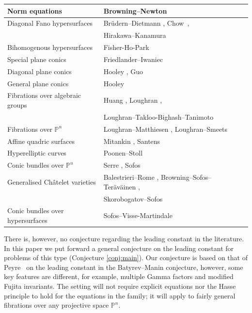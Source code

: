 \documentclass[a4paper,12pt,reqno]{amsart}
\numberwithin{equation}{section} \numberwithin{figure}{section}
\renewcommand\P{\mathbb{P}}
\renewcommand{\#}{\sharp}
\theoremstyle{definition}
\numberwithin{lemma}{section}
\begin{document}
\begin{center}
\begin{longtable}{| l | l | l | l |}
Norm equations & Browning--Newton \cite{BN15}        \\ \hline 



Diagonal Fano hypersurfaces & Br\"{u}dern--Dietmann \cite{MR3177289}, Chow~\cite{MR3253291},      
\\ & Hirakawa--Kanamura \cite{MR4322838}  \\ \hline 

Bihomogenous hypersurfaces  &
Fisher-Ho-Park \cite{FHP21} \\ \hline
Special plane conics  & Friedlander--Iwaniec   \cite{MR2675875}     \\ \hline 
 Diagonal plane conics & Hooley \cite{Hoo93}, Guo \cite{Guo95}     \\ \hline
   General plane conics & Hooley \cite{Hoo07}    \\ \hline 
  Fibrations over algebraic groups & Huang \cite{Hua21}, Loughran \cite{Lou18}, \\
  &  Loughran--Takloo-Bighash--Tanimoto  \cite{LTBT20} \\ \hline
  Fibrations over $\P^n$ &  Loughran--Matthiesen \cite {LM19}, Loughran--Smeets \cite{LS16}    \\ \hline 
Affine quadric surfaces &  Mitankin \cite{MR3664529}, Santens \cite{MR4450612}    \\ \hline 
Hyperelliptic curves &  Poonen--Stoll \cite{MR3245014}    \\ \hline 
Conic bundles over $\P^n$ &  Serre \cite{Ser90}, Sofos \cite{Sof16}    \\ \hline 
   Generalised {C}h\^{a}telet varieties &  Balestrieri--Rome \cite{BRbs}, Browning--Sofos--Ter\"av\"ainen \cite{bst},
\\ &
Skorobogatov--Sofos \cite {MR4542704}    \\ \hline 
 Conic bundles over hypersurfaces &  Sofos--Visse-Martindale \cite{MR4353917}    \\ \hline 
\end{longtable}
\end{center} 
\vspace{-20pt}

There is, however, no conjecture regarding the leading constant in the literature. 
In this paper we put forward a general conjecture  on the leading constant for problems of this type (Conjecture \ref{conj:main}). Our conjecture is based on that of Peyre~\cite{Pey95} on the leading constant in the Batyrev--Manin conjecture,
however, some key features are different, for example, multiple Gamma factors and modified Fujita invariants.  
The setting
will not require explicit equations nor the Hasse principle to hold for the equations in the family; 
it will apply to  fairly general 
   fibrations over any projective space $\P^n$.
\end{document}
